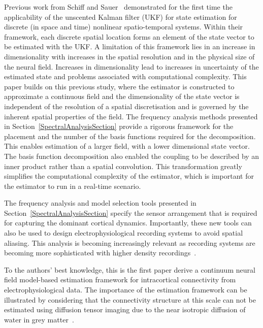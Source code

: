 \documentclass[10pt]{article}
\begin{document}
Previous work from Schiff and Sauer~\cite{schiff2008kalman} demonstrated for the first time the applicability of the unscented Kalman filter (UKF) for state estimation for discrete (in space and time) nonlinear spatio-temporal systems. Within their framework, each discrete spatial location forms an element of the state vector to be estimated with the UKF. A limitation of this framework lies in an increase in dimensionality with increases in the spatial resolution and in the physical size of the neural field. Increases in dimensionality lead to increases in uncertainty of the estimated state and problems associated with computational complexity. This paper builds on this previous study, where the estimator is constructed to approximate a continuous field and the dimensionality of the state vector is independent of the resolution of a spatial discretisation and is governed by the inherent spatial properties of the field. The frequency analysis methods presented in Section~\ref{SpectralAnalysisSection} provide a rigorous framework for the placement and the number of the basis functions required for the decomposition. This enables estimation of a larger field, with a lower dimensional state vector. The basis function decomposition also enabled the coupling to be described by an inner product rather than a spatial convolution. This transformation greatly simplifies the computational complexity of the estimator, which is important for the estimator to run in a real-time scenario.

The frequency analysis and model selection tools presented in Section~\ref{SpectralAnalysisSection} specify the sensor arrangement that is required for capturing the dominant cortical dynamics. Importantly, these new tools can also be used to design electrophysiological recording systems to avoid spatial aliasing. This analysis is becoming increasingly relevant as recording systems are becoming more sophisticated with higher density recordings~\cite{Brinkmann2009}. 

To the authors' best knowledge, this is the first paper derive a continuum neural field model-based estimation framework for intracortical connectivity from electrophysiological data. The importance of the estimation framework can be illustrated by considering that the connectivity structure at this scale can not be estimated using diffusion tensor imaging due to the near isotropic diffusion of water in grey matter~\cite{Assaf2008}. 
\end{document}
